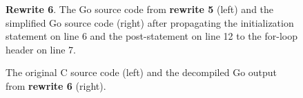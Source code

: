 \begin{figure}[htbp]
	\centering
	\begin{subfigure}[t]{0.45\textwidth}
		
	\end{subfigure}
	\qquad
	\begin{subfigure}[t]{0.45\textwidth}
		
	\end{subfigure}
	\caption{\textbf{Rewrite 6}. The Go source code from \textbf{rewrite 5} (left) and the simplified Go source code (right) after propagating the initialization statement on line 6 and the post-statement on line 12 to the for-loop header on line 7.}
	\label{fig:rewrite_6}
\end{figure}

\begin{figure}[htbp]
	\centering
	\begin{subfigure}[t]{0.49\textwidth}
		
	\end{subfigure}
	\qquad
	\begin{subfigure}[t]{0.45\textwidth}
		
	\end{subfigure}
	\caption{The original C source code (left) and the decompiled Go output from \textbf{rewrite 6} (right).}
	\label{fig:example1_comparison}
\end{figure}
